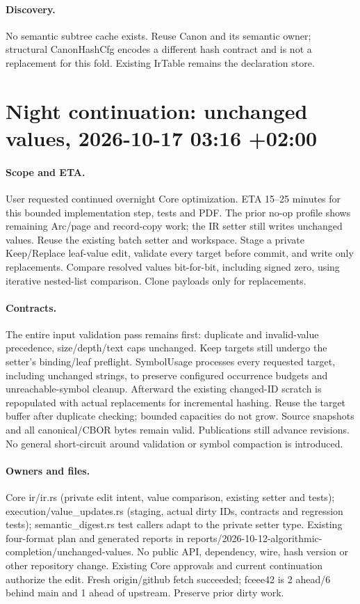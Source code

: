 \documentclass[11pt,a4paper]{article}
\begin{document}
\paragraph{Discovery.} No semantic subtree cache exists. Reuse Canon and its
semantic owner; structural CanonHashCfg encodes a different hash contract and is
not a replacement for this fold. Existing IrTable remains the declaration store.


\section*{Night continuation: unchanged values, 2026-10-17 03:16 +02:00}
\paragraph{Scope and ETA.} User requested continued overnight Core optimization.
ETA 15--25 minutes for this bounded implementation step, tests and PDF. The prior
no-op profile shows remaining Arc/page and record-copy work; the IR setter still
writes unchanged values. Reuse the existing batch setter and workspace. Stage a
private Keep/Replace leaf-value edit, validate every target before commit, and
write only replacements. Compare resolved values bit-for-bit, including signed
zero, using iterative nested-list comparison. Clone payloads only for replacements.
\paragraph{Contracts.} The entire input validation pass remains first: duplicate
and invalid-value precedence, size/depth/text caps unchanged. Keep targets still
undergo the setter's binding/leaf preflight. SymbolUsage processes every requested
target, including unchanged strings, to preserve configured occurrence budgets
and unreachable-symbol cleanup. Afterward the existing changed-ID scratch is
repopulated with actual replacements for incremental hashing. Reuse the target
buffer after duplicate checking; bounded capacities do not grow. Source snapshots
and all canonical/CBOR bytes remain valid. Publications still advance revisions.
No general short-circuit around validation or symbol compaction is introduced.
\paragraph{Owners and files.} Core ir/ir.rs (private edit intent, value comparison,
existing setter and tests); execution/value\_updates.rs (staging, actual dirty IDs,
contracts and regression tests); semantic\_digest.rs test callers adapt to the
private setter type. Existing four-format plan and generated reports in
reports/2026-10-12-algorithmic-completion/unchanged-values. No public API, dependency,
wire, hash version or other repository change. Existing Core approvals and current
continuation authorize the edit. Fresh origin/github fetch succeeded; fceee42 is
2 ahead/6 behind main and 1 ahead of upstream. Preserve prior dirty work.
\end{document}
